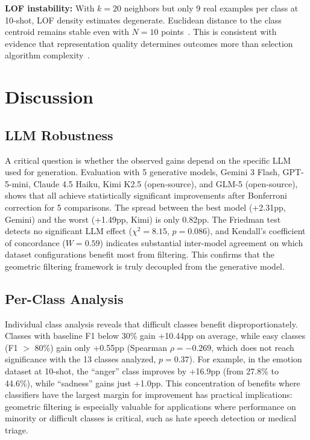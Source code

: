 \documentclass[conference]{IEEEtran}
\begin{document}
\textbf{LOF instability:} With $k=20$ neighbors but only 9 real examples per class at 10-shot, LOF density estimates degenerate. Euclidean distance to the class centroid remains stable even with $N=10$ points~\cite{robinson2025manifold}. This is consistent with evidence that representation quality determines outcomes more than selection algorithm complexity~\cite{du2025disentangling}.

\section{Discussion}

\subsection{LLM Robustness}

A critical question is whether the observed gains depend on the specific LLM used for generation. Evaluation with 5 generative models, Gemini 3 Flash, GPT-5-mini, Claude 4.5 Haiku, Kimi K2.5 (open-source), and GLM-5 (open-source), shows that all achieve statistically significant improvements after Bonferroni correction for 5 comparisons. The spread between the best model (+2.31pp, Gemini) and the worst (+1.49pp, Kimi) is only 0.82pp. The Friedman test detects no significant LLM effect ($\chi^2=8.15$, $p=0.086$), and Kendall's coefficient of concordance ($W = 0.59$) indicates substantial inter-model agreement on which dataset configurations benefit most from filtering. This confirms that the geometric filtering framework is truly decoupled from the generative model.

\subsection{Per-Class Analysis}

Individual class analysis reveals that difficult classes benefit disproportionately. Classes with baseline F1 below 30\% gain +10.44pp on average, while easy classes (F1 $>$ 80\%) gain only +0.55pp (Spearman $\rho=-0.269$, which does not reach significance with the 13 classes analyzed, $p=0.37$). For example, in the emotion dataset at 10-shot, the ``anger'' class improves by +16.9pp (from 27.8\% to 44.6\%), while ``sadness'' gains just +1.0pp. This concentration of benefits where classifiers have the largest margin for improvement has practical implications: geometric filtering is especially valuable for applications where performance on minority or difficult classes is critical, such as hate speech detection or medical triage.
\end{document}
